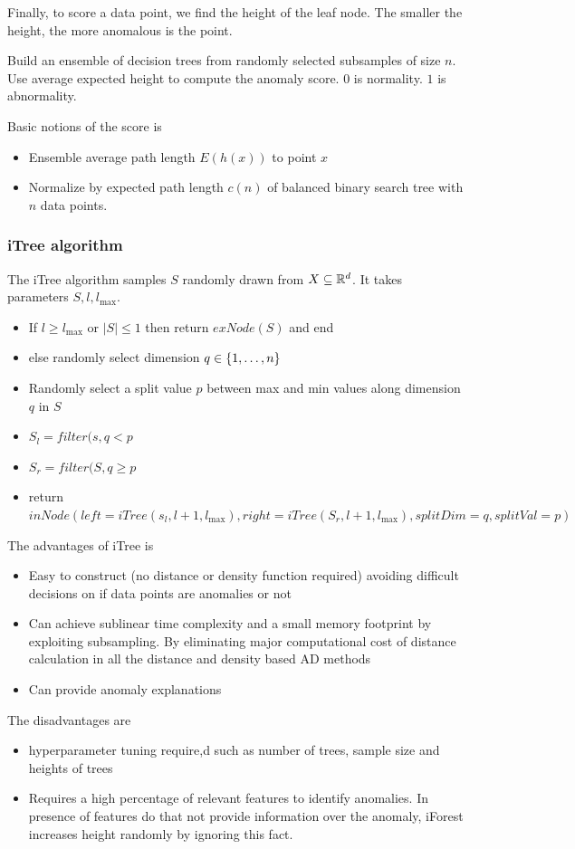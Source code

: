     Finally, to score a data point, we find the height of the leaf node. The smaller the height, the more anomalous is the point. 
    
    Build an ensemble of decision trees from randomly selected subsamples of size $n$. Use average expected height to compute the anomaly score. 0 is normality. $1$ is abnormality. 
    
    Basic notions of the score is
    \begin{itemize}
        \item Ensemble average path length $E(h(x))$ to point $x$
        \item Normalize by expected path length $c(n)$ of balanced binary search tree with $n$ data points. 
    \end{itemize}
    
\subsubsection{iTree algorithm}
    The iTree algorithm samples $S$ randomly drawn from $X \subseteq \mathbb{R}^d$. It takes parameters $S, l, l_\max$. 
    
    \begin{itemize}
        \item If $l \geq l_\max$ or $|S| \leq 1$ then return $exNode(S)$ and end
        \item else randomly select dimension $q \in \{1, \dots, n\}$
        \item Randomly select a split value $p$ between max and min values along dimension $q$ in $S$
        \item $S_l = filter(s, q \lt p$
        \item $S_r = filter(S, q \geq p$
        \item return $inNode(left = iTree(s_l, l + 1, l_\max), right = iTree(S_r, l + 1, l_\max),
        splitDim = q,
        splitVal = p
        )$
    \end{itemize}
    
    The advantages of iTree is
    \begin{itemize}
        \item Easy to construct (no distance or density function required) avoiding difficult decisions on if data points are anomalies or not
        \item Can achieve sublinear time complexity and a small memory footprint by exploiting subsampling. By eliminating major computational cost of distance calculation in all the distance and density based AD methods
        \item Can provide anomaly explanations
    \end{itemize}
    The disadvantages are
    \begin{itemize}
        \item hyperparameter tuning require,d such as number of trees, sample size and heights of trees
        \item Requires a high percentage of relevant features to identify anomalies. In presence of features do that not provide information over the anomaly, iForest increases height randomly by ignoring this fact.
    \end{itemize}
    